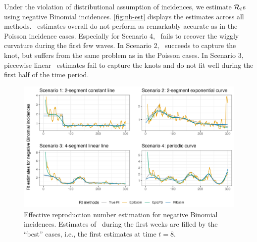 Under the violation of distributional assumption of incidences, we estimate $\mathcal{R}_t$s using negative Binomial incidences. \autoref{fig:nb-est} displays the estimates across all methods. \RtEstim\ estimates overall do not perform as remarkably accurate as in the Poisson incidence cases. Especially for Scenario 4, \RtEstim\ fails to recover the wiggly curvature during the first few waves. In Scenario 2, \RtEstim\ succeeds to capture the knot, but suffers from the same problem as in the Poisson cases. In Scenario 3, piecewise linear \RtEstim\ estimates fail to capture the knots and do not fit well during the first half of the time period. 
\begin{figure}[tb]
    \centering
    \includegraphics*[width=160mm]{fig/NB-res-plot.png}
    \caption{Effective reproduction number estimation for negative Binomial incidences. Estimates of \EpiEstim\ during the first weeks are filled by the ``best'' cases, i.e., the first estimates at time $t=8$.} 
    \label{fig:nb-est}
\end{figure}

